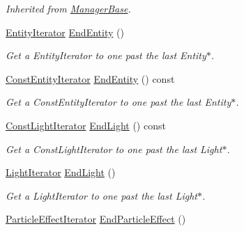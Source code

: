 \begin{DoxyCompactItemize}
\begin{DoxyCompactList}\small\item\em Inherited from \hyperlink{classMezzanine_1_1ManagerBase}{ManagerBase}. \item\end{DoxyCompactList}\item 
\hyperlink{classMezzanine_1_1SceneManager_a870dd323419dc7efe957cacc19a1391c}{EntityIterator} \hyperlink{classMezzanine_1_1SceneManager_a9e9325351566464d9009d1d6ce299f75}{EndEntity} ()
\begin{DoxyCompactList}\small\item\em Get a EntityIterator to one past the last Entity$\ast$. \item\end{DoxyCompactList}\item 
\hyperlink{classMezzanine_1_1SceneManager_a4fb46d68331a77da9036a3f704f7ee40}{ConstEntityIterator} \hyperlink{classMezzanine_1_1SceneManager_ad7b6c9cc55e92941f51429ec3cb5f5c6}{EndEntity} () const 
\begin{DoxyCompactList}\small\item\em Get a ConstEntityIterator to one past the last Entity$\ast$. \item\end{DoxyCompactList}\item 
\hyperlink{classMezzanine_1_1SceneManager_ad4f4649f45b71ddc0d728e64facd03c3}{ConstLightIterator} \hyperlink{classMezzanine_1_1SceneManager_ae51e93a3fdf6d996adc9806bb25d8ca6}{EndLight} () const 
\begin{DoxyCompactList}\small\item\em Get a ConstLightIterator to one past the last Light$\ast$. \item\end{DoxyCompactList}\item 
\hyperlink{classMezzanine_1_1SceneManager_a5c5a83086e8b63d21bcfcf38b0888101}{LightIterator} \hyperlink{classMezzanine_1_1SceneManager_a08baa4f2d539cf1b6d54fce558858081}{EndLight} ()
\begin{DoxyCompactList}\small\item\em Get a LightIterator to one past the last Light$\ast$. \item\end{DoxyCompactList}\item 
\hyperlink{classMezzanine_1_1SceneManager_a68a1a1ddc03cee28204759224405d40c}{ParticleEffectIterator} \hyperlink{classMezzanine_1_1SceneManager_a9fa8eca256c321e1eaa10e935c89feb1}{EndParticleEffect} ()

\end{DoxyCompactItemize}
